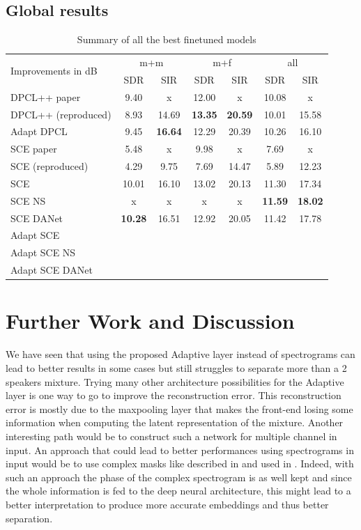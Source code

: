 \documentclass[master, tikz, final,11pt, dvipdfmx]{iscs-thesis}
\begin{document}
\section{Global results}



\lipsum[1]

\begin{table}[h]

\begin{tabular}{l|c|c|c|c|c|c}
\multirow{2}{*}{Improvements in dB} & \multicolumn{2}{c|}{m+m} & \multicolumn{2}{c|}{m+f} & \multicolumn{2}{c}{all} \\ 
\cline{2-7} 
 & SDR & SIR & SDR & SIR & SDR & SIR \\ 
\hline 
DPCL++ paper \cite{DPCLV2} & 9.40 & x & 12.00 & x & 10.08 & x \\ 
DPCL++ (reproduced) & 8.93 & 14.69 & \textbf{13.35} &\textbf{20.59} & 10.01 & 15.58 \\ 
Adapt DPCL & 9.45 & \textbf{16.64} & 12.29 & 20.39 & 10.26 & 16.10 \\ 
\hline
\hline
SCE paper \cite{SCE} & 5.48 & x & 9.98 & x & 7.69 & x \\ 
SCE (reproduced) & 4.29 & 9.75 & 7.69 & 14.47 & 5.89 & 12.23 \\ 
SCE & 10.01 & 16.10 & 13.02 & 20.13 & 11.30 & 17.34 \\ 
SCE NS & x & x & x & x & \textbf{11.59} & \textbf{18.02} \\ 
SCE DANet & \textbf{10.28} & 16.51 & 12.92 & 20.05 & 11.42 & 17.78 \\ 
Adapt SCE &  &  &  &  &  & \\ 
Adapt SCE NS &  &  &  &  &  & \\ 
Adapt SCE DANet &  &  &  &  &  & \\ 

\end{tabular}
\caption[Summary of the finetuned models]{Summary of all the best finetuned models}
\end{table}


\chapter{Further Work and Discussion}

We have seen that using the proposed Adaptive layer instead of spectrograms can lead to better results in some cases but still struggles to separate more than a 2 speakers mixture. Trying many other architecture possibilities for the Adaptive layer is one way to go to improve the reconstruction error. This reconstruction error is mostly due to the maxpooling layer that makes the front-end losing some information when computing the latent representation of the mixture.
Another interesting path would be to construct such a network for multiple channel in input.
An approach that could lead to better performances using spectrograms in input would be to use complex masks like described in \cite{OverviewSSDL} and used in \cite{ImageSS}. Indeed, with such an approach the phase of the complex spectrogram is as well kept and since the whole information is fed to the deep neural architecture, this might lead to a better interpretation to produce more accurate embeddings and thus better separation.
\end{document}
